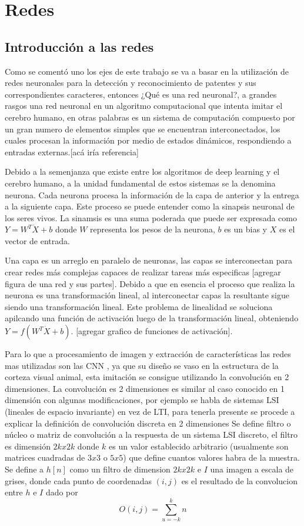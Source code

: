 \section{Redes}

\subsection{Introducción a las redes}

Como se comentó uno los ejes de este trabajo se va a basar en la utilización de redes neuronales para la detección y reconocimiento de patentes y sus correspondientes caracteres, entonces ¿Qué es una red neuronal?, a grandes rasgos una red neuronal en un algoritmo computacional que intenta imitar el cerebro humano, en otras palabras es un sistema de computación compuesto por un gran numero de elementos simples que se encuentran interconectados, los cuales procesan la información por medio de estados dinámicos, respondiendo a entradas externas.[acá iría referencia]

Debido a la semenjanza que existe entre los algoritmos de deep learning y el cerebro humano, a la unidad fundamental de estos sistemas se la denomina neurona.
Cada neurona procesa la información de la capa de anterior y la entrega a la siguiente capa. Este proceso se puede entender como la sinapsis neuronal de los seres vivos.
La sinamsis es una suma poderada que puede ser expresada como $Y = W^T\dot X + b$ donde $W$ representa los pesos de la neurona, $b$ es un bias y $X$ es el vector de entrada.

Una capa es un arreglo en paralelo de neuronas, las capas se interconectan para crear redes más complejas capaces de realizar tareas más especificas [agregar figura de una red y sus partes].
Debido a que en esencia el proceso que realiza la neurona es una transformación lineal, al interconectar capas la resultante sigue siendo una transformación lineal. Este problema de linealidad se soluciona apilcando una función de activación luego de la transformación lineal, obteniendo $Y=f(W^T \dot X + b)$. [agregar grafico de funciones de activación].

Para lo que a procesamiento de imagen y extracción de características las redes mas utilizadas son las CNN , ya que su diseño se vaso en la estructura de la corteza visual animal, esta imitación se consigue utilizando la convolución en 2 dimensiones.
La convolución es 2 dimensiones es similar al caso conocido en  1 dimensión con algunas modificaciones, por ejemplo se habla de sistemas LSI (lineales de espacio invariante) en vez de LTI, para tenerla presente se procede a explicar la definición de convolución discreta en 2 dimensiones
Se define filtro o núcleo  o matriz de convolución a la respuesta de un sistema LSI discreto, el filtro es dimensión $2k x 2k$ donde $k$ es un valor establecido arbitrario (usualmente son matrices cuadradas de $3x3$ o $5x5$) que define cuantos valores habra de la muestra.
Se define a $h[n]$ como un filtro de dimension $2k x 2k$ e $I$ una imagen a escala de grises, donde cada punto de coordenadas $(i,j)$ es el resultado de la convolucion entre $h$ e $I$ dado por 
\begin{equation}
O(i,j)= \sum_{u=-k}^{k}n
\end{equation}

